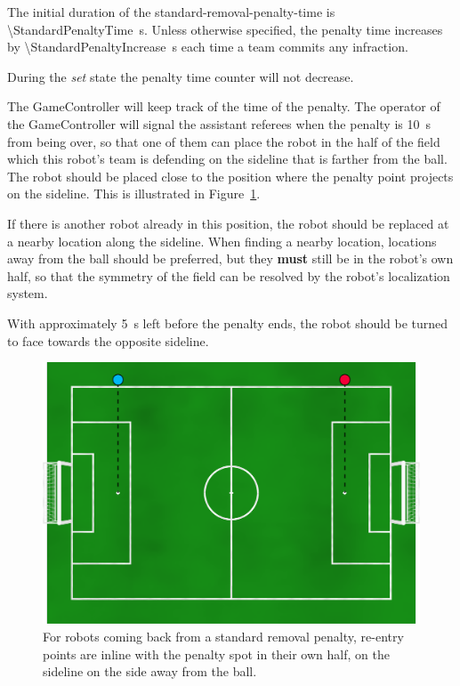The initial duration of the standard-removal-penalty-time is \qty{\StandardPenaltyTime}{\second}.
Unless otherwise specified, the penalty time increases by \qty{\StandardPenaltyIncrease}{\second} each time a team commits any infraction.

During the \emph{set} state the penalty time counter will not decrease.

The GameController will keep track of the time of the penalty. The operator of the GameController will signal the assistant referees when the penalty is \qty{10}{\second} from being over, so that one of them can place the robot in the half of the field which this robot's team is defending on the sideline that is farther from the ball. The robot should be placed close to the position where the penalty point projects on the sideline. This is illustrated in Figure~\ref{fig:penalty_re-entry_points}.

If there is another robot already in this position, the robot should be replaced at a nearby location along the sideline. When finding a nearby location, locations away from the ball should be preferred, but they \textbf{must} still be in the robot's own half, so that the symmetry of the field can be resolved by the robot's localization system.

With approximately \qty{5}{\second} left before the penalty ends, the robot should be turned to face towards the opposite sideline.

\begin{figure}[t]
\centerline{\includegraphics[width=\columnwidth]{figs/penalty_re-entry_points_2020.png}}
\caption{For robots coming back from a standard removal penalty, re-entry points  are inline with the penalty spot in their own half, on the sideline on the side away from the ball.}
\label{fig:penalty_re-entry_points}
\end{figure}

